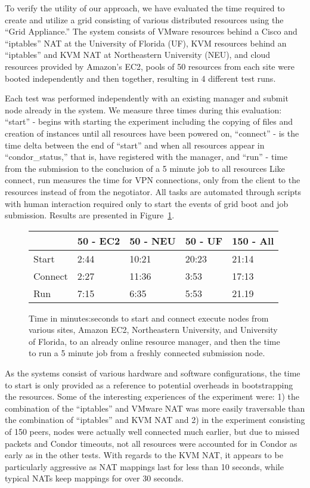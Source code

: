 \documentclass[conference]{IEEEtran}
\begin{document}
To verify the utility of our approach, we have evaluated the time required to
create and utilize a grid consisting of various distributed resources using the
``Grid Appliance.'' The system consists of VMware resources behind a Cisco and
``iptables'' NAT at the University of Florida (UF), KVM resources behind an
``iptables'' and KVM NAT at Northeastern University (NEU), and cloud resources
provided by Amazon's EC2, pools of 50 resources from each site were booted
independently and then together, resulting in 4 different test runs.

Each test was performed independently with an existing manager and submit node
already in the system.  We measure three times during this evaluation:
``start'' - begins with starting the experiment including the copying of files
and creation of instances until all resources have been powered on, ``connect''
- is the time delta between the end of ``start'' and when all resources appear
in ``condor\_status,'' that is, have registered with the manager, and ``run'' -
time from the submission to the conclusion of a 5 minute job to all resources
Like connect, run measures the time for VPN connections, only from the client
to the resources instead of from the negotiator.  All tasks are automated
through scripts with human interaction required only to start the events of
grid boot and job submission.  Results are presented in
Figure~\ref{fig:results}.

\begin{figure}[ht]
\small{
\setlength{\itemsep}{0pt}
\setlength{\parskip}{0pt}
\centering
\begin{tabular}[c]{|m{1.0cm}||m{1.2cm}|m{1.2cm}|m{1.2cm}|m{1.2cm}|} \hline
& 50 - EC2 & 50 - NEU & 50 - UF & 150 - All \\ \hline\hline
Start & 2:44 & 10:21 & 20:23 & 21:14 \\ \hline
Connect & 2:27 & 11:36 & 3:53 & 17:13\\ \hline
Run & 7:15 & 6:35 & 5:53 & 21.19 \\ \hline
\end{tabular}
\caption{\small{Time in minutes:seconds to start and connect execute nodes from
various sites, Amazon EC2, Northeastern University, and University of Florida,
to an already online resource manager, and then the time to run a 5 minute job
from a freshly connected submission node.}}
\label{fig:results}
}
\end{figure}

As the systems consist of various hardware and software configurations, the
time to start is only provided as a reference to potential overheads in
bootstrapping the resources.  Some of the interesting experiences of the
experiment were:  1) the combination of the ``iptables'' and VMware NAT was
more easily traversable than the combination of ``iptables'' and KVM NAT and 2)
in the experiment consisting of 150 peers, nodes were actually well connected
much earlier, but due to missed packets and Condor timeouts, not all resources
were accounted for in Condor as early as in the other tests.  With regards to
the KVM NAT, it appears to be particularly aggressive as NAT mappings last for
less than 10 seconds, while typical NATs keep mappings for over 30 seconds.
\end{document}
